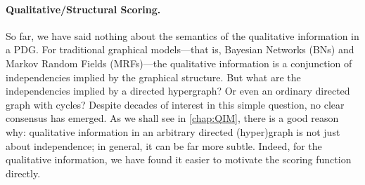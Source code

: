 \paragraph{Qualitative/Structural Scoring.}
	\label{ssec:qual-scoring}
So far, we have said nothing about the semantics of the qualitative information in a PDG.  
For traditional graphical models---that is, Bayesian Networks (BNs) and Markov Random Fields (MRFs)---the qualitative information is a conjunction of independencies implied by the graphical structure. 
But what are the independencies implied by a directed hypergraph? Or even an ordinary directed graph with cycles?
Despite decades of interest in this simple question, no clear consensus has emerged.
As we shall see in \cref{chap:QIM}, there is a good reason why: qualitative information in an arbitrary directed (hyper)graph is not just about independence; in general, it can be far more subtle. 
Indeed, for the qualitative information, we have found it easier to motivate the scoring function directly.


